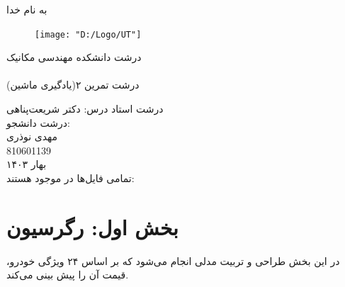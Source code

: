 \documentclass[11pt]{article}
\begin{document}
	به نام خدا\\
	\vspace{1cm}
	\begin{figure}[h]
		\begin{center}
			\texttt{[image: "D:/Logo/UT"]}
		\end{center}
	\end{figure}
	{‌درشت دانشکده مهندسی مکانیک}\\
	\vspace{1cm}
	{ }\\
	
	\vspace{0.5cm}
	{‌درشت تمرین ۲(یادگیری ماشین)}
	\vspace{1.5cm}
	
	\vspace{1.5cm}
	{‌درشت { استاد درس:} دکتر شریعت‌پناهی}\\
	\vspace{2cm}
	{‌درشت { دانشجو:}}\\
	{ مهدی نوذری\\
	810601139}\\
	\vspace{3cm}
	بهار ۱۴۰۳\\
	\pagebreak
	تمامی فایل‌ها در  موجود هستند:
	\href{https://github.com/Morphit/UT_AI_1403}{}
	\section{بخش اول: رگرسیون}
	در این بخش طراحی و تربیت مدلی انجام می‌شود که بر اساس ۲۴ ویژگی خودرو، قیمت آن را پیش بینی می‌کند.
\end{document}
